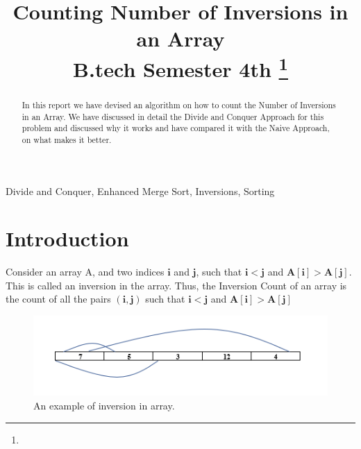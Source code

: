 \documentclass[conference]{IEEEtran}
\begin{document}
\title{Counting Number of Inversions in an Array\\
{\footnotesize B.tech Semester 4th}
\thanks{}
}

\author{
\and
{}
\and
{}
}

\maketitle

\noindent \begin{abstract}
In this report we have devised an algorithm on how to count the Number of Inversions in an Array.
We have discussed in detail the Divide and Conquer Approach for this problem and discussed why it works and have compared it with the Naive Approach, on what makes it better.
\end{abstract}

\noindent \begin{IEEEkeywords}
Divide and Conquer, Enhanced Merge Sort, Inversions, Sorting
\end{IEEEkeywords}

\section{\textbf{Introduction}}
\noindent Consider an array A, and two indices $\bm{i}$ and $\bm{j}$, such that $\bm{i}<\bm{j}$ and $\bm{A[i]} > \bm{A[j]}$. This is called an inversion in the array. Thus, the Inversion Count of an array is the count of all the pairs $\bm{(i,j)}$ such that $\bm{i}<\bm{j}$ and $\bm{A[i]}>\bm{A[j]}$ \\

\begin{figure}[htbp]
\centerline{\includegraphics{inversion.png}}
\caption{An example of inversion in array.}
\label{fig}
\end{figure}
\end{document}
